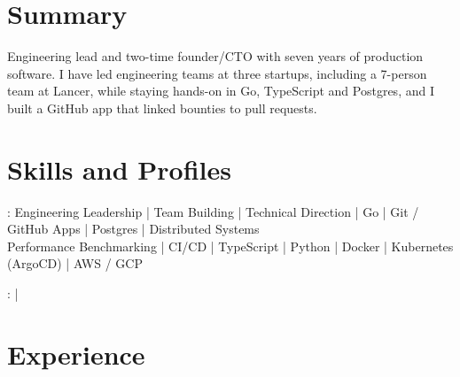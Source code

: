 \documentclass[print]{jack-resume}
\begin{document}
\pagecolor{darkmodeBackground}


\begin{minipage}[t][1cm][t]{.03\textwidth}
    \hfill
\end{minipage}

\section{Summary}
Engineering lead and two-time founder/CTO with seven years of production software. I have led engineering teams at three startups, including a 7-person team at Lancer, while staying hands-on in Go, TypeScript and Postgres, and I built a GitHub app that linked bounties to pull requests.
\sectionsep

\section{Skills and Profiles}
:
Engineering Leadership \hfill | \hfill
Team Building \hfill | \hfill
Technical Direction \hfill | \hfill
Go \hfill | \hfill
Git / GitHub Apps \hfill | \hfill
Postgres \hfill | \hfill
Distributed Systems \\
\hspace{1.0cm} Performance Benchmarking \hfill | \hfill
CI/CD \hfill | \hfill
TypeScript \hfill | \hfill
Python \hfill | \hfill
Docker \hfill | \hfill
Kubernetes (ArgoCD) \hfill | \hfill
AWS / GCP \\

\raggedright{
    :
      \href{https://www.linkedin.com/in/jack-sturtevant/}{ \ExternalLink} |
     \href{https://github.com/jacksturt}{ \ExternalLink}}

\section{Experience}
\end{document}
